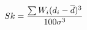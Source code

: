 \documentclass[10pt]{article}
\begin{document}
\begin{align*}Sk = {\sum W_i(d_i-\overline d)^3\over 100\sigma^3}\end{align*}
\end{document}
